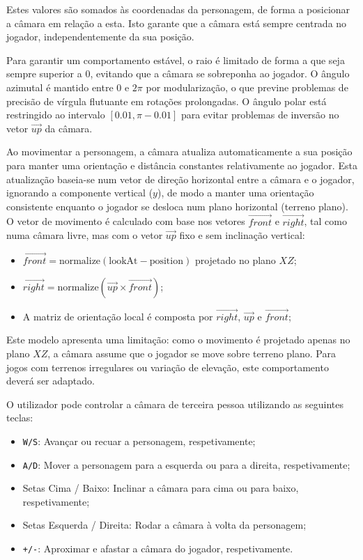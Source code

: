 \documentclass[12pt, a4paper]{article}
\begin{document}
Estes valores são somados às coordenadas da personagem, de forma a posicionar a câmara em relação
a esta. Isto garante que a câmara está sempre centrada no jogador, independentemente da sua
posição.

Para garantir um comportamento estável, o raio é limitado de forma a que seja sempre superior a $0$,
evitando que a câmara se sobreponha ao jogador. O ângulo azimutal é mantido entre $0$ e $2\pi$ por
modularização, o que previne problemas de precisão de vírgula flutuante em rotações prolongadas.
O ângulo polar está restringido ao intervalo $[0.01, \pi - 0.01]$ para evitar problemas de inversão
no vetor $\vec{up}$ da câmara.

Ao movimentar a personagem, a câmara atualiza automaticamente a sua posição para manter uma
orientação e distância constantes relativamente ao jogador. Esta atualização baseia-se num vetor
de direção horizontal entre a câmara e o jogador, ignorando a componente vertical ($y$), de modo a
manter uma orientação consistente enquanto o jogador se desloca num plano horizontal (terreno
plano). O vetor de movimento é calculado com base nos vetores $\vec{front}$ e $\vec{right}$, tal
como numa câmara livre, mas com o vetor $\vec{up}$ fixo e sem inclinação vertical:

\begin{itemize}
    \item $\vec{front} = \text{normalize}( \text{lookAt} - \text{position} )$ projetado no plano
    $XZ$;
    \item $\vec{right} = \text{normalize}( \vec{up} \times \vec{front} )$;
    \item A matriz de orientação local é composta por $\vec{right}$, $\vec{up}$ e $\vec{front}$;
\end{itemize}

Este modelo apresenta uma limitação: como o movimento é projetado apenas no plano $XZ$, a
câmara assume que o jogador se move sobre terreno plano. Para jogos com terrenos irregulares ou
variação de elevação, este comportamento deverá ser adaptado.

O utilizador pode controlar a câmara de terceira pessoa utilizando as seguintes teclas:

\begin{itemize}
    \item \texttt{W/S}: Avançar ou recuar a personagem, respetivamente;
    \item \texttt{A/D}: Mover a personagem para a esquerda ou para a direita, respetivamente;
    \item Setas Cima / Baixo: Inclinar a câmara para cima ou para baixo, respetivamente;
    \item Setas Esquerda / Direita: Rodar a câmara à volta da personagem;
    \item \texttt{+/-}: Aproximar e afastar a câmara do jogador, respetivamente.
\end{itemize}
\end{document}
